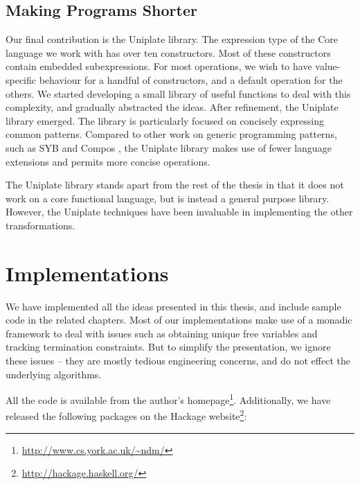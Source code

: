 \subsection{Making Programs Shorter}

Our final contribution is the Uniplate library. The expression type of the Core language we work with has over ten constructors. Most of these constructors contain embedded subexpressions. For most operations, we wish to have value-specific behaviour for a handful of constructors, and a default operation for the others. We started developing a small library of useful functions to deal with this complexity, and gradually abstracted the ideas. After refinement, the Uniplate library emerged. The library is particularly focused on concisely expressing common patterns. Compared to other work on generic programming patterns, such as SYB \cite{lammel:syb} and Compos \cite{bringert:compos}, the Uniplate library makes use of fewer language extensions and permits more concise operations.

The Uniplate library stands apart from the rest of the thesis in that it does not work on a core functional language, but is instead a general purpose library. However, the Uniplate techniques have been invaluable in implementing the other transformations.


\section{Implementations}
\label{secI:implementation}

We have implemented all the ideas presented in this thesis, and include sample code in the related chapters. Most of our implementations make use of a monadic framework to deal with issues such as obtaining unique free variables and tracking termination constraints. But to simplify the presentation, we ignore these issues -- they are mostly tedious engineering concerns, and do not effect the underlying algorithms.

All the code is available from the author's homepage\footnote{\url{http://www.cs.york.ac.uk/~ndm/}}. Additionally, we have released the following packages on the Hackage website\footnote{\url{http://hackage.haskell.org/}}:

